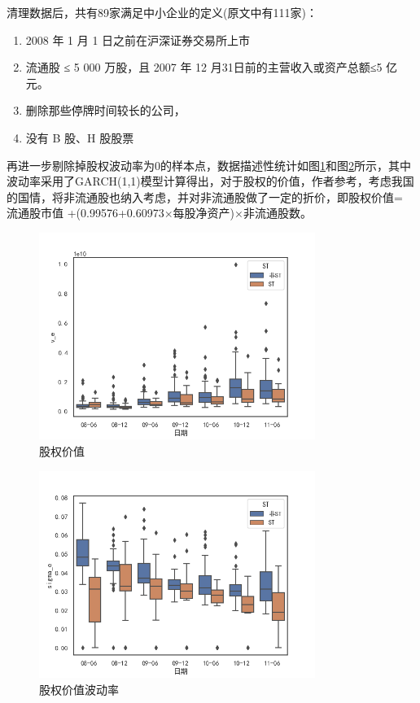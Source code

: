 \documentclass[a4paper,12pt]{ctexart}
\begin{document}
清理数据后，共有89家满足\citet{彭伟2012基于}中小企业的定义(原文中有111家)：
\begin{enumerate}
    \item 2008 年 1 月 1 日之前在沪深证券交易所上市
    \item 流通股 ≤ 5 000 万股，且 2007 年 12 月31日前的主营收入或资产总额≤5 亿元。
    \item 删除那些停牌时间较长的公司，
    \item 没有 B 股、H 股股票
\end{enumerate}

再进一步剔除掉股权波动率为0的样本点，数据描述性统计如图\ref{fig:des1}和图\ref{fig:des2}所示，其中波动率采用了GARCH(1,1)模型计算得出，对于股权的价值，作者参考\citet{张绍敏2007基于违约距离的财务预警模型}，考虑我国的国情，将非流通股也纳入考虑，并对非流通股做了一定的折价，即股权价值= 流通股市值 +(0.99576+0.60973$\times$每股净资产)$\times$非流通股数。
\begin{figure}[H]
    \centering
    \includegraphics[width=0.8\textwidth]{img/v_e.png}
    \caption{股权价值}\label{fig:des1}
\end{figure}
\begin{figure}[H]
    \centering
    \includegraphics[width=0.8\textwidth]{img/sigma_e.png}
    \caption{股权价值波动率}\label{fig:des2}
\end{figure}
\end{document}

